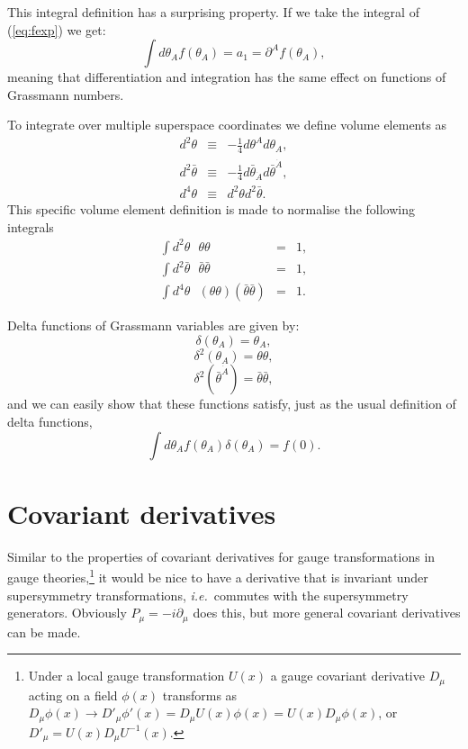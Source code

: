\documentclass[notes.tex]{subfiles}
\begin{document}
This integral definition has a surprising property. If we take the integral of (\ref{eq:fexp}) we get:
\[\int d\theta_A f(\theta_A) = a_1 = \partial^A f(\theta_A),\]
meaning that differentiation and integration has the same effect on functions of Grassmann numbers.

To integrate over multiple superspace coordinates we define volume elements as
\begin{eqnarray*}
d^2\theta &\equiv& -\frac{1}{4}d\theta^Ad\theta_A,\\
d^2\bar{\theta} &\equiv& -\frac{1}{4}d\bar{\theta}_{\dot{A}}d\bar{\theta}^{\dot{A}},\\
d^4\theta &\equiv& d^2\theta d^2\bar{\theta}.
\end{eqnarray*}
This specific volume element definition is made to normalise the following integrals
\begin{eqnarray*}
\int d^2\theta\text{ }\theta\theta &=& 1,\\
\int d^2\bar{\theta}\text{ }\bar{\theta} \bar{\theta} &=& 1,\\
\int d^4 \theta \text{ }(\theta\theta)(\bar{\theta} \bar{\theta}) &=& 1.
\end{eqnarray*}

Delta functions of Grassmann variables are given by:
\[\delta(\theta_A) = \theta_A,\]
\[\delta^2(\theta_A) = \theta\theta,\]
\[\delta^2(\bar{\theta}^{\dot{A}}) = \bar{\theta}\bar{\theta},\]
and we can easily show that these functions satisfy, just as the usual definition of delta functions,
\[\int d\theta_A f(\theta_A)\delta(\theta_A) = f(0).\]



\section{Covariant derivatives}
\label{sec:covder}
Similar to the properties of covariant derivatives for gauge transformations in gauge theories,\footnote{Under a local gauge transformation $U(x)$ a gauge covariant derivative $D_\mu$ acting on a field $\phi(x)$ transforms as $D_\mu\phi(x)\to D'_\mu\phi'(x)=D_\mu U(x)\phi(x)=U(x)D_\mu \phi(x)$, or $D'_\mu=U(x)D_\mu U^{-1}(x)$.} it would be nice to have a derivative that is invariant under supersymmetry transformations, {\it i.e.}\ commutes with the supersymmetry generators. Obviously $P_\mu = -i\partial_\mu$ does this, but more general covariant derivatives can be made.
\end{document}

